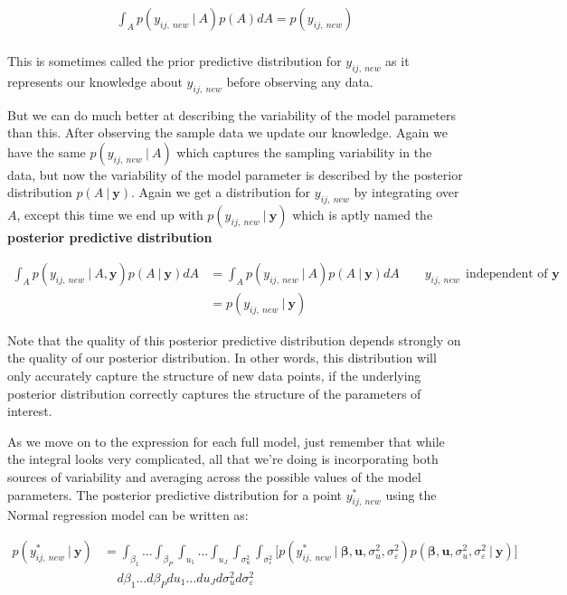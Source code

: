 \documentclass[12pt,twoside]{reedthesis}
\begin{document}
\[
\begin{aligned}
\int_A p(y_{ij, \ new} \ | \ A)p(A )dA   = p(y_{ij, \ new} )   \\
\end{aligned}
\]

This is sometimes called the prior predictive distribution for \(y_{ij, \ new}\) as it represents our knowledge about \(y_{ij, \ new}\) before observing any data.

But we can do much better at describing the variability of the model parameters than this. After observing the sample data we update our knowledge. Again we have the same \(p(y_{ij, \ new} \ | \ A)\) which captures the sampling variability in the data, but now the variability of the model parameter is described by the posterior distribution \(p(A \ | \ \mathbf{y})\). Again we get a distribution for \(y_{ij, \ new}\) by integrating over \(A\), except this time we end up with \(p(y_{ij, \ new} \ | \ \mathbf{y})\) which is aptly named the \textbf{posterior predictive distribution}

\[
\begin{aligned}
\int_A p(y_{ij, \ new} \ | \ A, \mathbf{y})p(A \ | \ \mathbf{y})dA &=  \int_A p(y_{ij, \ new} \ | \ A)p(A \ | \ \mathbf{y})dA \qquad y_{ij, \ new} \ \  \text{independent of } \mathbf{y} \\
&= p(y_{ij, \ new} \ | \ \mathbf{y})\
\end{aligned}
\]

Note that the quality of this posterior predictive distribution depends strongly on the quality of our posterior distribution. In other words, this distribution will only accurately capture the structure of new data points, if the underlying posterior distribution correctly captures the structure of the parameters of interest.

As we move on to the expression for each full model, just remember that while the integral looks very complicated, all that we're doing is incorporating both sources of variability and averaging across the possible values of the model parameters. The posterior predictive distribution for a point \(y^*_{ij, \ new}\) using the Normal regression model can be written as:

\[
\begin{aligned}
p(y^*_{ij, \ new} \ | \ \mathbf{y}) &=  \int_{\beta_1}  \dots \int_{\beta_P} \int_{u_1} \dots \int_{u_J} \int_{\sigma_{u}^2} \int_{\sigma_{\varepsilon}^2} \bigg[p(y^*_{ij, \ new} \ | \ \boldsymbol{\beta}, \boldsymbol{u}, \sigma_{u}^2, \sigma_{\varepsilon}^2)p(\boldsymbol{\beta}, \mathbf{u}, \sigma_{u}^2, \sigma_{\varepsilon}^2 \ | \ \mathbf{y})\bigg] \\
& \ \ \ \ \ d\beta_1 ...  d\beta_Pdu_1...du_Jd\sigma_{u}^2d\sigma_{\varepsilon}^2
\end{aligned}
\]
\end{document}
